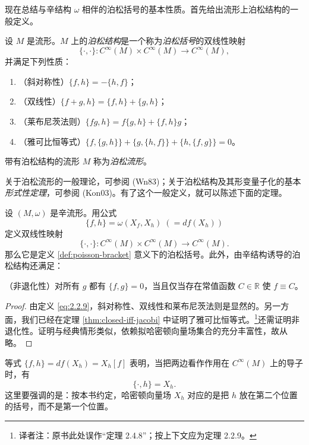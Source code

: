 现在总结与辛结构 $\omega$ 相伴的泊松括号的基本性质。首先给出流形上泊松结构的一般定义。

\begin{definition}[泊松括号]
\label{def:poisson-bracket}
设 $M$ 是流形。$M$ 上的\emph{泊松结构}是一个称为\emph{泊松括号}的双线性映射
\[
  \{\mathord\cdot,\mathord\cdot\}:C^\infty(M)\times C^\infty(M)
  \longrightarrow C^\infty(M),
\]
并满足下列性质：
\begin{enumerate}[label=(\arabic*)]
  \item （斜对称性）$\{f,h\}=-\{h,f\}$；
  \item （双线性）$\{f+g,h\}=\{f,h\}+\{g,h\}$；
  \item （莱布尼茨法则）$\{fg,h\}=f\{g,h\}+\{f,h\}g$；
  \item （雅可比恒等式）$\{f,\{g,h\}\}+\{g,\{h,f\}\}+\{h,\{f,g\}\}=0$。
\end{enumerate}
带有泊松结构的流形 $M$ 称为\emph{泊松流形}。
\end{definition}

关于泊松流形的一般理论，可参阅 (Wn83)；关于泊松结构及其形变量子化的基本\emph{形式性定理}，可参阅 (Kon03)。有了这个一般定义，就可以陈述下面的定理。

\begin{theorem}
\label{thm:symplectic-poisson-bracket}
设 $(M,\omega)$ 是辛流形。用公式
\begin{equation}
  \{f,h\}=\omega(X_f,X_h)\;(=df(X_h))
  \label{eq:2.2.9}
\end{equation}
定义双线性映射
\[
  \{\mathord\cdot,\mathord\cdot\}:C^\infty(M)\times C^\infty(M)
  \longrightarrow C^\infty(M).
\]
那么它是定义 \ref{def:poisson-bracket} 意义下的泊松括号。此外，由辛结构诱导的泊松结构还满足：

（非退化性）对所有 $g$ 都有 $\{f,g\}=0$，当且仅当存在常值函数 $C\in\mathbb R$ 使 $f\equiv C$。
\end{theorem}

\begin{proof}
由定义 \eqref{eq:2.2.9}，斜对称性、双线性和莱布尼茨法则是显然的。另一方面，我们已经在定理 \ref{thm:closed-iff-jacobi} 中证明了雅可比恒等式。\footnote{译者注：原书此处误作“定理 2.4.8”；按上下文应为定理 2.2.9。}还需证明非退化性。证明与经典情形类似，依赖拟哈密顿向量场集合的充分丰富性，故从略。
\end{proof}

等式 $\{f,h\}=df(X_h)=X_h[f]$ 表明，当把两边看作作用在 $C^\infty(M)$ 上的导子时，有
\begin{equation}
  \{\mathord\cdot,h\}=X_h.
  \label{eq:2.2.10}
\end{equation}
这里要强调的是：按本书约定，哈密顿向量场 $X_h$ 对应的是把 $h$ 放在第二个位置的括号，而不是第一个位置。

